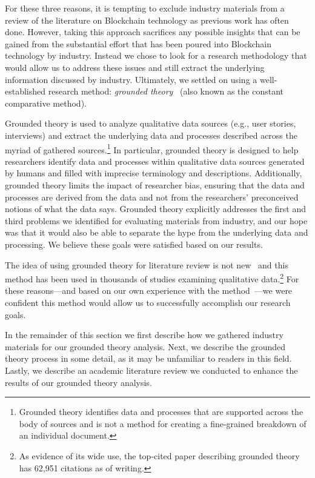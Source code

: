 For these three reasons, it is tempting to exclude industry materials from a review of the literature on Blockchain technology as previous work has often done.
However, taking this approach sacrifices any possible insights that can be gained from the substantial effort that has been poured into Blockchain technology by industry.
Instead we chose to look for a research methodology that would allow us to address these issues and still extract the underlying information discussed by industry.
Ultimately, we settled on using a well-established research method: \emph{grounded theory}~\cite{glaser1965constant,strauss1990basics,corbin1990grounded} (also known as the constant comparative method).

Grounded theory is used to analyze qualitative data sources (e.g., user stories, interviews) and extract the underlying data and processes described across the myriad of gathered sources.\footnote{Grounded theory identifies data and processes that are supported across the body of sources and is not a method for creating a fine-grained breakdown of an individual document.}
In particular, grounded theory is designed to help researchers identify data and processes within qualitative data sources generated by humans and filled with imprecise terminology and descriptions.
Additionally, grounded theory limits the impact of researcher bias, ensuring that the data and processes are derived from the data and not from the researchers' preconceived notions of what the data says.
Grounded theory explicitly addresses the first and third problems we identified for evaluating materials from industry, and our hope was that it would also be able to separate the hype from the underlying data and processing. We believe these goals were satisfied based on our results. 

The idea of using grounded theory for literature review is not new~\cite{wolfswinkel2013using,yang2012descriptive} and this method has been used in thousands of studies examining qualitative data.\footnote{As evidence of its wide use, the top-cited paper describing grounded theory has 62,951 citations as of writing.}
For these reasons---and based on our own experience with the method~\cite{ruoti2017weighing}---we were confident this method would allow us to successfully accomplish our research goals.

In the remainder of this section we first describe how we gathered industry materials for our grounded theory analysis.
Next, we describe the grounded theory process in some detail, as it may be unfamiliar to readers in this field.
Lastly, we describe an academic literature review we conducted to enhance the results of our grounded theory analysis.

